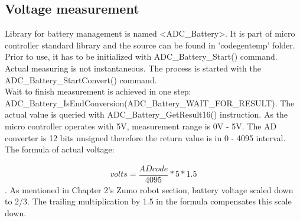 \documentclass[11pt,a4paper,oneside,article]{memoir}
\begin{document}
\subsection{Voltage measurement}
\begin{sloppypar}
Library for battery management is named \textless ADC\_Battery\textgreater . It is part of micro controller standard library and the source can be found in 'codegentemp' folder. Prior to use, it has to be initialized with ADC\_Battery\_Start() command.
Actual measuring is not instantaneous. The process is started with the ADC\_Battery\_StartConvert() command.\\
Wait to finish measurement is achieved in one step: ADC\_Battery\_IsEndConversion(ADC\_Battery\_WAIT\_FOR\_RESULT).
The actual value is queried with ADC\_Battery\_GetResult16() instruction. As the micro controller operates with 5V, measurement range is 0V - 5V. The AD converter is 12 bits unsigned therefore the return value is in 0 - 4095 interval. The formula of actual voltage:
\end{sloppypar}
\begin{align}
volts = \dfrac{AD code}{4095} * 5 * 1.5
\end{align}
. As mentioned in Chapter 2's Zumo robot section, battery voltage scaled down to 2/3. The trailing multiplication by 1.5 in the formula compensates this scale down.
\end{document}
